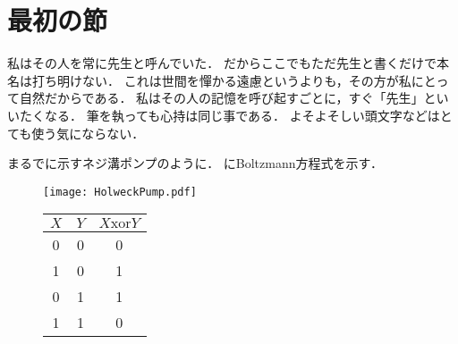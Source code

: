 \section{最初の節}

私はその人\citep{Asakura2021}を常に先生と呼んでいた．
だからここでもただ先生と書くだけで本名は打ち明けない．
これは世間を憚かる遠慮というよりも，その方が私にとって自然だからである．
私はその人の記憶を呼び起すごとに，すぐ「先生」といいたくなる．
筆を執っても心持は同じ事である．
よそよそしい頭文字などはとても使う気にならない．

まるでに示すネジ溝ポンプのように．
にBoltzmann方程式を示す．

\begin{figure}[b]
  \centering
  \begin{minipage}{0.6\hsize}
    \centering
    \texttt{[image: HolweckPump.pdf]}
    \label{fig:HolweckPump}
  \end{minipage}
  \begin{minipage}{0.3\hsize}
    \centering
    \begin{tabular}{cc|c}
      $X$ & $Y$ & $X \mathrm{xor} Y$ \\\hline
      0 & 0 & 0 \\
      1 & 0 & 1 \\
      0 & 1 & 1 \\
      1 & 1 & 0 \\
    \end{tabular}
  \end{minipage}
  
\end{figure}

